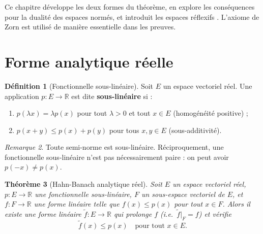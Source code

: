 \documentclass[a4paper,12pt]{book}
\newcommand{\R}{\mathbb{R}}
\theoremstyle{definition}
\newtheorem{definition}{Définition}[chapter]
\theoremstyle{plain}
\newtheorem{theoreme}[definition]{Théorème}
\theoremstyle{remark}
\newtheorem{remarque}[definition]{Remarque}
\begin{document}
Ce chapitre développe les deux formes du théorème, en explore les conséquences pour la
dualité des espaces normés, et introduit les espaces réflexifs%
. L'axiome de Zorn est utilisé de manière
essentielle dans les preuves.

\section{Forme analytique réelle}
\label{sec:hb-reel}


\begin{definition}[Fonctionnelle sous-linéaire]\label{def:sous-lineaire}
Soit $E$ un espace vectoriel réel. Une application $p : E \to \R$ est dite
\textbf{sous-linéaire} si :
\begin{enumerate}[label=(\roman*)]
    \item $p(\lambda x) = \lambda p(x)$ pour tout $\lambda > 0$ et tout $x \in E$
          (homogénéité positive) ;
    \item $p(x + y) \leq p(x) + p(y)$ pour tous $x, y \in E$ (sous-additivité).
\end{enumerate}
\end{definition}

\begin{remarque}\label{rem:semi-norme-sous-lineaire}
Toute semi-norme est sous-linéaire. Réciproquement, une fonctionnelle sous-linéaire
n'est pas nécessairement paire : on peut avoir $p(-x) \neq p(x)$.
\end{remarque}

\begin{theoreme}[Hahn-Banach analytique réel]\label{thm:hahn-banach-reel}
Soit $E$ un espace vectoriel réel, $p : E \to \R$ une fonctionnelle sous-linéaire, $F$
un sous-espace vectoriel de $E$, et $f : F \to \R$ une forme linéaire telle que
$f(x) \leq p(x)$ pour tout $x \in F$. Alors il existe une forme linéaire
$\tilde{f} : E \to \R$ qui prolonge $f$ (i.e.\ $\tilde{f}|_F = f$) et vérifie
\[
    \tilde{f}(x) \leq p(x) \quad \text{pour tout } x \in E.
\]
\end{theoreme}
\end{document}
